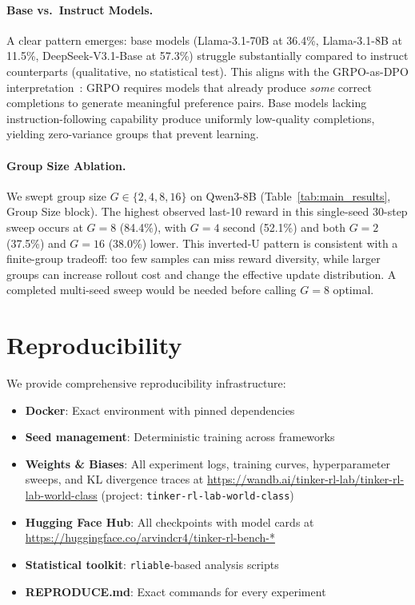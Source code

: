 \documentclass{article}
\begin{document}
\paragraph{Base vs.~Instruct Models.}
A clear pattern emerges: base models (Llama-3.1-70B at 36.4\%, Llama-3.1-8B at 11.5\%, DeepSeek-V3.1-Base at 57.3\%) struggle substantially compared to instruct counterparts (qualitative, no statistical test).
This aligns with the GRPO-as-DPO interpretation~\cite{wu2025grpo_dpo}: GRPO requires models that already produce \emph{some} correct completions to generate meaningful preference pairs.
Base models lacking instruction-following capability produce uniformly low-quality completions, yielding zero-variance groups that prevent learning.

\paragraph{Group Size Ablation.}
We swept group size $G \in \{2, 4, 8, 16\}$ on Qwen3-8B (Table~\ref{tab:main_results}, Group Size block).
The highest observed last-10 reward in this single-seed 30-step sweep occurs at
$G{=}8$ (84.4\%), with $G{=}4$ second (52.1\%) and both $G{=}2$ (37.5\%) and
$G{=}16$ (38.0\%) lower. This inverted-U pattern is consistent with a finite-group
tradeoff: too few samples can miss reward diversity, while larger groups can
increase rollout cost and change the effective update distribution. A completed
multi-seed sweep would be needed before calling $G{=}8$ optimal.

\section{Reproducibility}
\label{sec:reproducibility}

We provide comprehensive reproducibility infrastructure:
\begin{itemize}
    \item \textbf{Docker}: Exact environment with pinned dependencies
    \item \textbf{Seed management}: Deterministic training across frameworks
    \item \textbf{Weights \& Biases}: All experiment logs, training curves,
    hyperparameter sweeps, and KL divergence traces at
    \url{https://wandb.ai/tinker-rl-lab/tinker-rl-lab-world-class}
    (project: \texttt{tinker-rl-lab-world-class})
    \item \textbf{Hugging Face Hub}: All checkpoints with model cards at
    \url{https://huggingface.co/arvindcr4/tinker-rl-bench-*}
    \item \textbf{Statistical toolkit}: \texttt{rliable}-based analysis scripts
    \item \textbf{REPRODUCE.md}: Exact commands for every experiment
\end{itemize}
\end{document}
